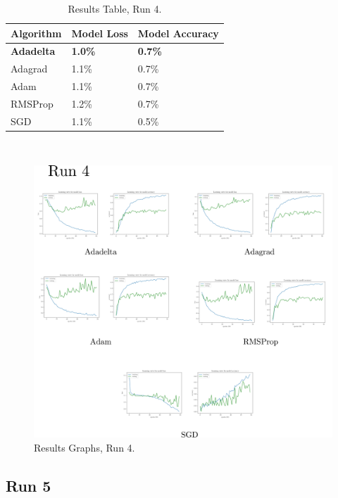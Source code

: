 \documentclass[report, 11pt, oneside]{dissertation}
\begin{document}
\begin{table}[H]
	\centering
	\begin{tabular}{|l|l|l|}
	\hline
		Algorithm         & Model Loss     & Model Accuracy \\ \hline
		\textbf{Adadelta} & \textbf{1.0\%} & \textbf{0.7\%} \\ \hline
		Adagrad           & 1.1\%          & 0.7\%          \\ \hline
		Adam              & 1.1\%          & 0.7\%          \\ \hline
		RMSProp           & 1.2\%          & 0.7\%          \\ \hline
		SGD               & 1.1\%          & 0.5\%          \\ \hline
		\end{tabular}
	\caption{Results Table, Run 4.}
	\label{tab:results_4}
\end{table}

\ \

\begin{figure}[H]
   \centering
	\includegraphics[scale=0.20]{figure_34.pdf}
	\caption{Results Graphs, Run 4.}
	\label{fig:results_graphs_4}
\end{figure}


\subsection{Run 5}
\end{document}
